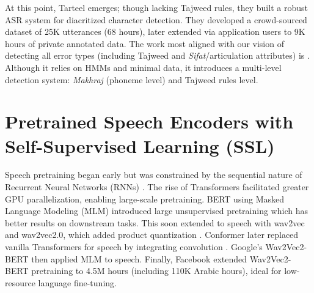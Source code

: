 At this point, Tarteel \cite{tarteelai} emerges; though lacking Tajweed rules, they built a robust ASR system for diacritized character detection. They developed a crowd-sourced dataset \cite{khan2021tarteel} of 25K utterances (68 hours), later extended via application users to 9K hours of private annotated data. The work most aligned with our vision of detecting all error types (including Tajweed and \textit{Sifat}/articulation attributes) is \cite{putra2012developing}. Although it relies on HMMs and minimal data, it introduces a multi-level detection system: \textit{Makhraj} (phoneme level) and Tajweed rules level.

\section{Pretrained Speech Encoders with Self-Supervised Learning (SSL)}

Speech pretraining began early \cite{hinton2006reducing} but was constrained by the sequential nature of Recurrent Neural Networks (RNNs) \cite{hopfield1982neural}. The rise of Transformers \cite{vaswani2017attention} facilitated greater GPU parallelization, enabling large-scale pretraining. BERT \cite{devlin2019bert} using Masked Language Modeling (MLM) introduced large unsupervised pretraining which has better results on downstream tasks. This soon extended to speech with wav2vec \cite{schneider2019wav2vec} and wav2vec2.0, which added product quantization \cite{baevski2020wav2vec}. Conformer later replaced vanilla Transformers for speech by integrating convolution \cite{gulati2020conformer}. Google's Wav2Vec2-BERT \cite{chung2021w2v} then applied MLM to speech. Finally, Facebook extended Wav2Vec2-BERT pretraining \cite{barrault2023seamless} to 4.5M hours (including 110K Arabic hours), ideal for low-resource language fine-tuning.





